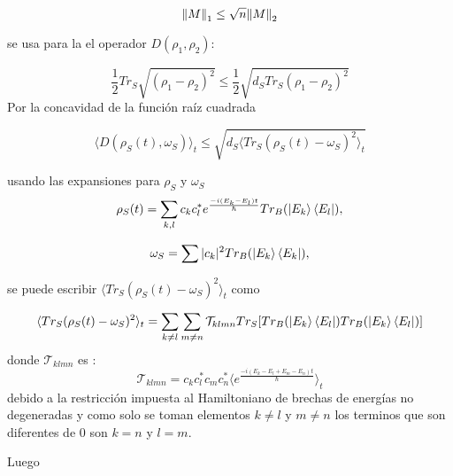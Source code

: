 \begin{equation}
\norm{M}_{1} \le \sqrt{n}\norm{M}_{2}
\end{equation}

se usa para la el operador $D(\rho_{1}, \rho_{2})$:

\begin{equation}
\frac{1}{2} Tr_{S} \sqrt{(\rho_{1} - \rho_{2})^{2}} \le \frac{1}{2}\sqrt{d_{S} Tr_{S} (\rho_{1}- \rho_{2})^{2}}
\end{equation}
Por la concavidad de la función raíz cuadrada

\begin{equation}
\langle D(\rho_{S}(t),\omega_{S}) \rangle_{t} \le \sqrt{  d_{S} \Big \langle Tr_{S}(\rho_{S}(t)-\omega_{S})^{2} \Big \rangle_{t}}
\end{equation}

usando las expansiones para $\rho_{S}$ y $\omega_{S}$
\begin{equation}
\rho_{S}(t)=\sum_{k,l} c_{k} c_{l}^{*} e^{\frac{-i(E_{k}-E_{l})t}{\hbar}} Tr_{B} (\ket{E_{k}} \bra{E_{l}}),
\end{equation}

\begin{equation}
\omega_{S} = \sum |c_{k}|^{2} Tr_{B}(\ket{E_{k}} \bra{E_{k}}),
\end{equation}

se puede escribir $\langle Tr_{S}(\rho_{S}(t)-\omega_{S})^{2} \rangle_{t}$ como 

\begin{equation}
\langle Tr_{S}(\rho_{S}(t)-\omega_{S})^{2} \rangle_{t}=\sum_{k \neq l} \sum_{m \neq n} \mathcal{T}_{klmn} Tr_{S} [Tr_{B}(\ket{E_{k}} \bra{E_{l}}) Tr_{B}(\ket{E_{k}} \bra{E_{l}})]
\end{equation}
donde $\mathcal{T}_{klmn}$ es :
\begin{equation}
\mathcal{T}_{klmn}=c_{k}c_{l}^{*}c_{m}c_{n}^{*} \Big \langle e^{\frac{-i(E_{k}-E_{l}+E_{m}-E_{n})t}{\hbar}} \Big \rangle_{t}
\end{equation}
debido a la restricción impuesta al Hamiltoniano de brechas de energías no degeneradas y como solo se toman elementos $k \neq l$ y $m\neq n$ los terminos que son diferentes de $0$ son $k=n$ y $l=m$.

Luego
 
